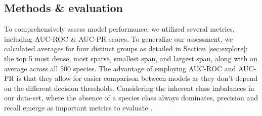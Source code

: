 \subsection{Methods \& evaluation}



To comprehensively assess model performance, we utilized several metrics, including AUC-ROC \& AUC-PR scores. 
To generalize our assessment, we calculated averages for four distinct groups as detailed in Section \ref{sec:explore}: the top 5 most dense, most sparse, smallest span, and largest span, along with an average across all 500 species. The advantage of employing AUC-ROC and AUC-PR is that they allow for easier comparison between models as they don't depend on the different decision thresholds. Considering the inherent class imbalances in our data-set, where the absence of a species class always dominates, precision and recall emerge as important metrics to evaluate \cite{saito2015precision}.

